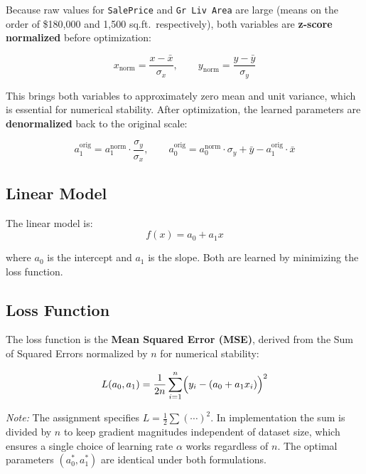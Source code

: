 \documentclass[12pt,a4paper]{article}
\begin{document}
Because raw values for \texttt{SalePrice} and \texttt{Gr Liv Area} are large (means on
the order of \$180,000 and 1,500 sq.ft.\ respectively), both variables are
\textbf{z-score normalized} before optimization:

\begin{equation}
    x_{\text{norm}} = \frac{x - \bar{x}}{\sigma_x}, \qquad
    y_{\text{norm}} = \frac{y - \bar{y}}{\sigma_y}
\end{equation}

This brings both variables to approximately zero mean and unit variance, which is
essential for numerical stability. After optimization, the learned parameters are
\textbf{denormalized} back to the original scale:

\begin{equation}
    a_1^{\text{orig}} = a_1^{\text{norm}} \cdot \frac{\sigma_y}{\sigma_x}, \qquad
    a_0^{\text{orig}} = a_0^{\text{norm}} \cdot \sigma_y + \bar{y}
                        - a_1^{\text{orig}} \cdot \bar{x}
\end{equation}

\subsection{Linear Model}

The linear model is:
\begin{equation}
    f(x) = a_0 + a_1 x
\end{equation}

where \(a_0\) is the intercept and \(a_1\) is the slope. Both are learned by
minimizing the loss function.

\subsection{Loss Function}

The loss function is the \textbf{Mean Squared Error (MSE)}, derived from the
Sum of Squared Errors normalized by \(n\) for numerical stability:

\begin{equation}
    L(a_0, a_1) = \frac{1}{2n} \sum_{i=1}^{n}
    \Bigl(y_i - (a_0 + a_1 x_i)\Bigr)^2
    \label{eq:loss}
\end{equation}

\textit{Note:} The assignment specifies \(L = \frac{1}{2}\sum(\cdots)^2\). In
implementation the sum is divided by \(n\) to keep gradient magnitudes independent of
dataset size, which ensures a single choice of learning rate \(\alpha\) works
regardless of \(n\). The optimal parameters \((a_0^*, a_1^*)\) are identical under
both formulations.
\end{document}
